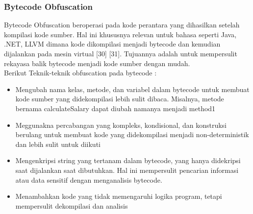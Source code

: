 \subsubsection{\f{Bytecode Obfuscation}}
Bytecode Obfuscation beroperasi pada kode perantara yang dihasilkan setelah kompilasi kode sumber. Hal ini khususnya relevan untuk bahasa seperti Java, .NET, LLVM dimana kode dikompilasi menjadi bytecode dan kemudian dijalankan pada mesin virtual [30] [31]. Tujuannya adalah untuk mempersulit rekayasa balik bytecode menjadi kode sumber dengan mudah.\\
Berikut Teknik-teknik obfuscation pada bytecode :
\begin{itemize}
	\item {} Mengubah nama kelas, metode, dan variabel dalam bytecode untuk membuat kode sumber yang didekompilasi lebih sulit dibaca. Misalnya, metode bernama calculateSalary dapat diubah namanya menjadi method1
	\item {} Meggunakna  percabangan yang kompleks, kondisional, dan konstruksi berulang untuk membuat kode yang didekompilasi menjadi non-deterministik dan lebih sulit untuk diikuti
	\item {} Mengenkripsi string yang tertanam dalam bytecode, yang hanya didekripsi saat dijalankan saat dibutuhkan. Hal ini mempersulit pencarian informasi atau data sensitif dengan menganalisis bytecode.
	\item {} Menambahkan kode yang tidak memengaruhi logika program, tetapi mempersulit dekompilasi dan analisis
\end{itemize}

